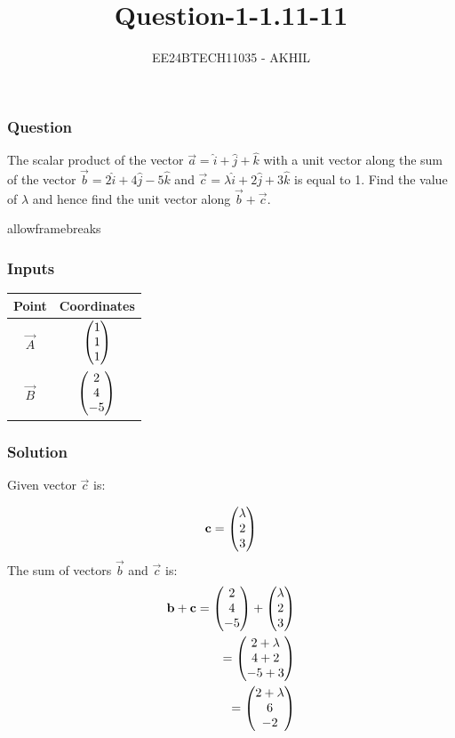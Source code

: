 \documentclass{beamer}
\begin{document}
\title{Question-1-1.11-11}
\author{EE24BTECH11035 - AKHIL}
\date{}
\frame{\titlepage}

\begin{frame}
\frametitle{Question}
The scalar product of the vector $\vec{a}=\hat{i}+\hat{j}+\hat{k}$ with a unit vector along the sum of the vector $\vec{b}=2\hat{i}+4\hat{j}-5\hat{k}$ and $\vec{c}=\lambda\hat{i}+2\hat{j}+3\hat{k}$ is equal to 1. Find the  value of $\lambda$ and hence find the  unit vector along $\Vec{b}+\Vec{c}$.\\
\end{frame}

\begin{frame}{allowframebreaks}
\frametitle{Inputs}

    \centering
    
    \label{tab:parameters}
	\begin{tabular}{ |c| c|}
    \hline
    \textbf{Point}  & \textbf{Coordinates}\\
    \hline
    $\vec{A}$ & $\begin{pmatrix}1 \\ 1 \\1\end{pmatrix}$ \\
    \hline
    $\vec{B}$ & $\begin{pmatrix}2 \\ 4 \\ -5\end{pmatrix}$\\
    \hline
\end{tabular}
\end{frame}

\begin{frame}
\frametitle{Solution}
Given vector $\vec{c}$ is:

\begin{align}
\mathbf{c} = \begin{pmatrix}\lambda \\ 2 \\ 3\end{pmatrix}
\end{align}
The sum of vectors $\vec{b}$ and $\vec{c}$ is:
\begin{align}
\mathbf{b} + \mathbf{c} = \begin{pmatrix}2 \\ 4 \\ -5\end{pmatrix} + \begin{pmatrix}\lambda \\ 2 \\ 3\end{pmatrix} \\
= \begin{pmatrix}2 + \lambda \\ 4 + 2 \\ -5 + 3\end{pmatrix} \\
= \begin{pmatrix}2 + \lambda \\ 6 \\ -2\end{pmatrix}
\end{align}
\end{frame}
\end{document}
